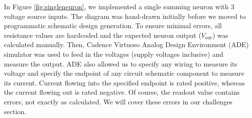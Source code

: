 In Figure \ref{fig:singleneuron}, we implemented a single summing neuron with 3 voltage source inputs. The diagram was hand-drawn initially before we moved to programmatic schematic design generation. To ensure minimal errors, all resistance values are hardcoded and the expected neuron output ($V_{\text{out}}$) was calculated manually. Then, Cadence Virtuoso Analog Design Environment (ADE) simulator was used to feed in the voltages (supply voltages inclusive) and measure the output. ADE also allowed us to specify any wiring to measure its voltage and specify the endpoint of any circuit schematic component to measure its current. Current flowing into the specified endpoint is rated positive, whereas the current flowing out is rated negative. Of course, the readout value contains errors, not exactly as calculated. We will cover these errors in our challenges section.